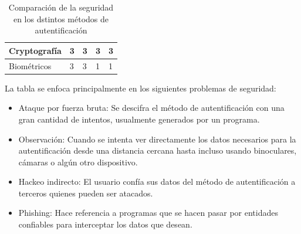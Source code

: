 \documentclass[12pt, a4paper, titlepage]{article}
\begin{document}
\begin{table}[htb]
{\begin{tabular}{l|l|l|l|l|}
					\multicolumn{1}{|l|}{Cryptografía}                                                     & 3                                                                 & 3           & 3                                                          & 3        \\ \hline
					\multicolumn{1}{|l|}{Biométricos}                                                      & 3                                                                 & 3           & 1                                                          & 1        \\ \hline
				\end{tabular}
			}
			\caption{Comparación de la seguridad en los dstintos métodos de autentificación}
		\end{table}
		La tabla se enfoca principalmente en los siguientes problemas de seguridad: 
		
		\begin{itemize}
			\item Ataque por fuerza bruta: Se descifra el método de autentificación con una gran cantidad de intentos, usualmente generados por un programa.
			\item Observación: Cuando se intenta ver directamente los datos necesarios para la autentificación desde una distancia cercana hasta incluso usando binoculares, cámaras o algún otro dispositivo.
			\item Hackeo indirecto: El usuario confía sus datos del método de autentificación a terceros quienes pueden ser atacados. 
			\item Phishing: Hace referencia a programas que se hacen pasar por entidades confiables para interceptar los datos que desean.
		\end{itemize}
		
\end{document}
